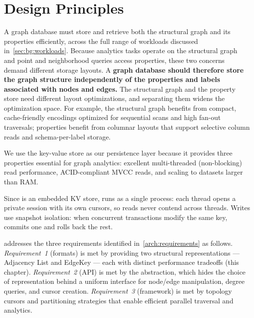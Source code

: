 \section{Design Principles}
\label{arch:design-principles}

A graph database must store and retrieve both the structural graph and its properties efficiently, across the full range of workloads discussed in~\autoref{sec:bg:workloads}.
Because analytics tasks operate on the structural graph and point and neighborhood queries access properties, these two concerns demand different storage layouts.
A \textbf{graph database should therefore store the graph structure independently of the properties and labels associated with nodes and edges.}
The structural graph and the property store need different layout optimizations, and separating them widens the optimization space.
For example, the structural graph benefits from compact, cache-friendly encodings optimized for sequential scans and high fan-out traversals; properties benefit from columnar layouts that support selective column reads and schema-per-label storage.

We use the \wt{} key-value store as our persistence layer because it provides three properties essential for graph analytics:
excellent multi-threaded (non-blocking) read performance, ACID-compliant MVCC reads, and scaling to datasets larger than RAM.

Since \wt{} is an embedded KV store, \project{} runs as a single process: each thread opens a private session with its own cursors, so reads never contend across threads.
Writes use snapshot isolation: when concurrent transactions modify the same key, \wt{} commits one and rolls back the rest.

\project{} addresses the three requirements identified in~\autoref{arch:requirements} as follows.
\emph{Requirement~1} (formats) is met by providing two structural representations --- Adjacency List and EdgeKey --- each with distinct performance tradeoffs (this chapter).
\emph{Requirement~2} (API) is met by the  abstraction, which hides the choice of representation behind a uniform interface for node/edge manipulation, degree queries, and cursor creation.
\emph{Requirement~3} (framework) is met by topology cursors and partitioning strategies that enable efficient parallel traversal and analytics.

